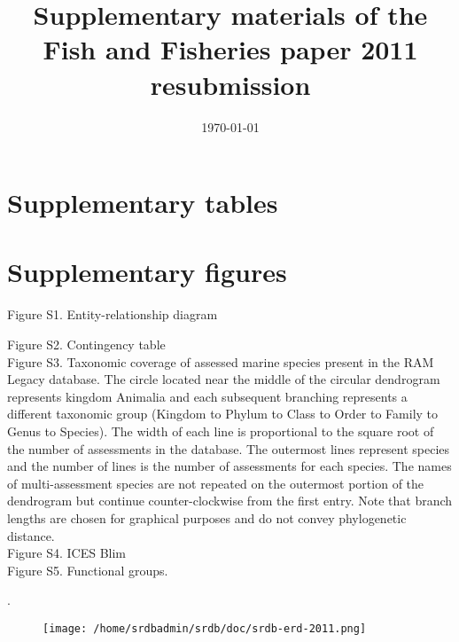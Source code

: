 \documentclass[letterpaper,review,authoryear,12pt]{article}
\title{Supplementary materials of the Fish and Fisheries paper 2011 resubmission}
\date{\today}
\begin{document}
\renewcommand{\figurename}{Fig. S}
\renewcommand{\tablename}{Table S}

\maketitle
\section{Supplementary tables}

\begin{landscape}
\begin{tiny}

\end{tiny}
\end{landscape}



\section{Supplementary figures}
\noindent Figure S1. Entity-relationship diagram


\noindent Figure S2. Contingency table\\ 

\noindent Figure S3. Taxonomic coverage of assessed marine species
present in the RAM Legacy database. The circle located near the middle
of the circular dendrogram represents kingdom Animalia and each
subsequent branching represents a different taxonomic group (Kingdom
to Phylum to Class to Order to Family to Genus to Species). The width
of each line is proportional to the square root of the number of
assessments in the database. The outermost lines represent species and
the number of lines is the number of assessments for each species. The
names of multi-assessment species are not repeated on the outermost
portion of the dendrogram but continue counter-clockwise from the
first entry.  Note that branch lengths are chosen for graphical
purposes and do not
convey phylogenetic distance.\\

\noindent Figure S4. ICES Blim\\ 

\noindent Figure S5. Functional groups.\\ 


\begin{landscape}
.\begin{figure}
\begin{center}
\texttt{[image: /home/srdbadmin/srdb/doc/srdb-erd-2011.png]}
\end{center}
\caption{ }\label{fig:erd}
\end{figure}
\end{landscape}
\end{document}
